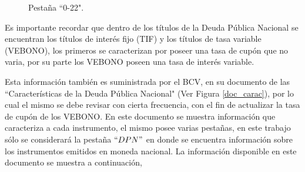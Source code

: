 \vspace{0.5cm}

\begin{figure}[h]
\caption{Pesta\~na ``0-22".}
\label{doc_bcv}
\end{figure}

\vspace{0.5cm}

\hspace{0.4cm} Es importante recordar que dentro de los t\'itulos de la Deuda P\'ublica Nacional se encuentran los t\'itulos de inter\'es fijo (TIF) y los t\'itulos de tasa variable (VEBONO), los primeros se caracterizan por poseer una tasa de cup\'on que no varia, por su parte los VEBONO poseen una tasa de inter\'es variable.

\vspace{0.5cm}

\hspace{0.4cm}Esta informaci\'on tambi\'en es suministrada por el BCV, en su documento de las ``Caracter\'isticas de la Deuda P\'ublica Nacional" (Ver Figura \ref{doc_carac}), por lo cual el mismo se debe revisar con cierta frecuencia, con el fin de actualizar la tasa de cup\'on de los VEBONO. En este documento se muestra informaci\'on que caracteriza a cada instrumento, el mismo posee varias pesta\~nas, en este trabajo s\'olo se considerar\'a la pesta\~na $``DPN"$ en donde se encuentra informaci\'on sobre los instrumentos emitidos en moneda nacional. La informaci\'on disponible en este documento se muestra a continuaci\'on,

